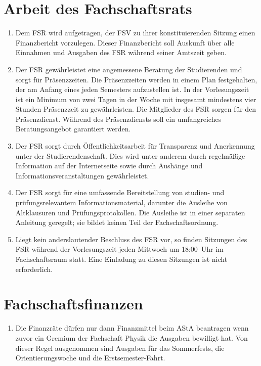 \section{Arbeit des Fachschaftsrats}
\begin{enumerate}
	\item Dem FSR wird aufgetragen, der FSV zu ihrer konstituierenden Sitzung einen Finanzbericht vorzulegen.
	Dieser Finanzbericht soll Auskunft über alle Einnahmen und Ausgaben des FSR während seiner Amtszeit geben.
	\item Der FSR gewährleistet eine angemessene Beratung der Studierenden und sorgt für Präsenzzeiten.
	Die Präsenzzeiten werden in einem Plan festgehalten, der am Anfang eines jeden Semesters aufzustellen ist.
	In der Vorlesungszeit ist ein Minimum von zwei Tagen in der Woche mit insgesamt mindestens vier Stunden Präsenzzeit zu gewährleisten.
	Die Mitglieder des FSR sorgen für den Präsenzdienst.
	Während des Präsenzdiensts soll ein umfangreiches Beratungsangebot garantiert werden.
	\item Der FSR sorgt durch Öffentlichkeitsarbeit für Transparenz und Anerkennung unter der Studierendenschaft.
	Dies wird unter anderem durch regelmäßige Information auf der Internetseite sowie durch Aushänge und Informationsveranstaltungen gewährleistet.
	\item Der FSR sorgt für eine umfassende Bereitstellung von studien- und prüfungsrelevantem Informationsmaterial, darunter die Ausleihe von Altklausuren und Prüfungsprotokollen.
	Die Ausleihe ist in einer separaten Anleitung geregelt; sie bildet keinen Teil der Fachschaftsordnung.
	\item Liegt kein anderslautender Beschluss des FSR vor, so finden Sitzungen des FSR während der Vorlesungszeit jeden Mittwoch um 18:00~Uhr im Fachschaftsraum statt.
	Eine Einladung zu diesen Sitzungen ist nicht erforderlich.
\end{enumerate}

\section{Fachschaftsfinanzen}
\label{sec:finanzen}
\begin{enumerate}
	\item \label{item:finanzen_beschluss}
Die Finanzräte dürfen nur dann Finanzmittel beim AStA beantragen wenn zuvor ein Gremium der Fachschaft Physik die Ausgaben bewilligt hat.
	Von dieser Regel ausgenommen sind Ausgaben für das Sommerfests, die Orientierungswoche und die Erstsemester-Fahrt.
\end{enumerate}

